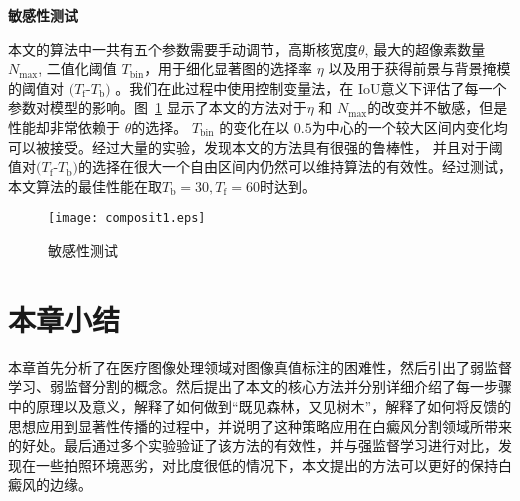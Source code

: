 \begin{table}[htbp]
\label{tab:ablation}
\begin{center}
\caption{简化模型分析：针对不同的先验知识与显著性传播过程}
%
\end{center}

  \label{tab:ablation}%
\end{table}%

\textbf{敏感性测试}

本文的算法中一共有五个参数需要手动调节，高斯核宽度$\theta$, 最大的超像素数量 ${N_\mathrm{max}}$, 二值化阈值 ${T_\mathrm{bin}}$，用于细化显著图的选择率 $\eta$ 以及用于获得前景与背景掩模的阈值对 $(T_\mathrm{f}$-$T_\mathrm{b})$ 。我们在此过程中使用控制变量法，在 $\mathrm{IoU}$意义下评估了每一个参数对模型的影响。图~\ref{fig:Sensitivity} 显示了本文的方法对于$\eta$ 和 ${N_\mathrm{max}}$的改变并不敏感，但是性能却非常依赖于 $\theta$的选择。 ${T_\mathrm{bin}}$ 的变化在以 $0.5$为中心的一个较大区间内变化均可以被接受。经过大量的实验，发现本文的方法具有很强的鲁棒性， 并且对于阈值对$(T_\mathrm{f}$-$T_\mathrm{b})$的选择在很大一个自由区间内仍然可以维持算法的有效性。经过测试，本文算法的最佳性能在取${T_\mathrm{b}}=30,{T_\mathrm{f}}=60$时达到。

\begin{figure}[htbp]
\begin{center}
\texttt{[image: composit1.eps]}
\end{center}
   \caption{敏感性测试}
\label{fig:Sensitivity}
\end{figure}


\section{本章小结}
本章首先分析了在医疗图像处理领域对图像真值标注的困难性，然后引出了弱监督学习、弱监督分割的概念。然后提出了本文的核心方法并分别详细介绍了每一步骤中的原理以及意义，解释了如何做到“既见森林，又见树木”，解释了如何将反馈的思想应用到显著性传播的过程中，并说明了这种策略应用在白癜风分割领域所带来的好处。最后通过多个实验验证了该方法的有效性，并与强监督学习进行对比，发现在一些拍照环境恶劣，对比度很低的情况下，本文提出的方法可以更好的保持白癜风的边缘。



















